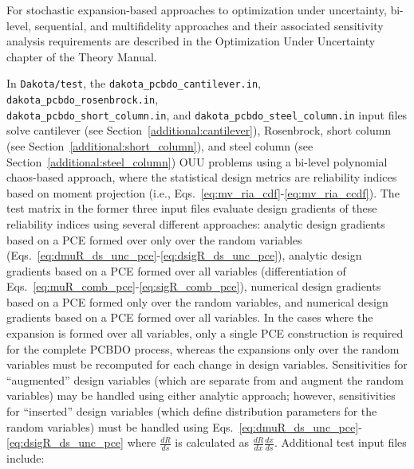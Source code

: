 For stochastic expansion-based approaches to optimization under
uncertainty, bi-level, sequential, and multifidelity approaches and
their associated sensitivity analysis requirements are described in
the Optimization Under Uncertainty chapter of the Theory Manual.

In \texttt{Dakota/test}, the \texttt{dakota\_pcbdo\_cantilever.in},
\texttt{dakota\_pcbdo\_rosenbrock.in},\\
\texttt{dakota\_pcbdo\_short\_column.in}, and
\texttt{dakota\_pcbdo\_steel\_column.in} input files solve 
cantilever (see Section~\ref{additional:cantilever}), Rosenbrock,
short column (see Section~\ref{additional:short_column}), and steel
column (see Section~\ref{additional:steel_column}) OUU problems using
a bi-level polynomial chaos-based approach, where the statistical
design metrics are reliability indices based on moment projection
(i.e., Eqs.~\ref{eq:mv_ria_cdf}-\ref{eq:mv_ria_ccdf}).  The test
matrix in the former three input files evaluate design gradients of
these reliability indices using several different approaches: analytic
design gradients based on a PCE formed over only over the random
variables (Eqs.~\ref{eq:dmuR_ds_unc_pce}-\ref{eq:dsigR_ds_unc_pce}),
analytic design gradients based on a PCE formed over all variables
(differentiation of
Eqs.~\ref{eq:muR_comb_pce}-\ref{eq:sigR_comb_pce}), numerical design
gradients based on a PCE formed only over the random variables, and
numerical design gradients based on a PCE formed over all variables.
In the cases where the expansion is formed over all variables, only a
single PCE construction is required for the complete PCBDO process,
whereas the expansions only over the random variables must be
recomputed for each change in design variables.  Sensitivities for
``augmented'' design variables (which are separate from and augment
the random variables) may be handled using either analytic approach;
however, sensitivities for ``inserted'' design variables (which define
distribution parameters for the random variables) must be handled
using Eqs.~\ref{eq:dmuR_ds_unc_pce}-\ref{eq:dsigR_ds_unc_pce} where
$\frac{dR}{ds}$ is calculated as $\frac{dR}{dx} \frac{dx}{ds}$.
Additional test input files include:
